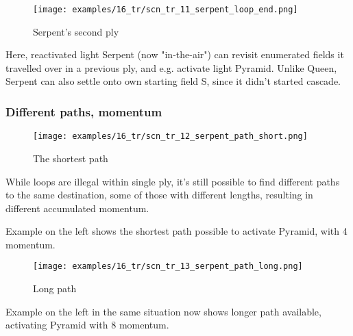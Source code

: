 \vspace*{-2.1\baselineskip}
\noindent
\begin{figure}[!h]
\texttt{[image: examples/16\_tr/scn\_tr\_11\_serpent\_loop\_end.png]}
\caption{Serpent's second ply}
\label{fig:scn_tr_11_serpent_loop_end}
\end{figure}

Here, reactivated light Serpent (now "in-the-air") can revisit enumerated fields
it travelled over in a previous ply, and e.g. activate light Pyramid. \newline
\indent
Unlike Queen, Serpent can also settle onto own starting field S, since it didn't
started cascade.

\clearpage %

\subsubsection*{Different paths, momentum}
\label{sec:Tamoanchan Revisited/Serpent/Movement/Different paths, momentum}

\vspace*{-1.2\baselineskip}
\noindent
\begin{wrapfigure}[9]{l}{0.4\textwidth}
\centering
\texttt{[image: examples/16\_tr/scn\_tr\_12\_serpent\_path\_short.png]}
\vspace*{-0.5\baselineskip}
\caption{The shortest path}
\label{fig:scn_tr_12_serpent_path_short}
\end{wrapfigure}
While loops are illegal within single ply, it's still possible to find
different paths to the same destination, some of those with different
lengths, resulting in different accumulated momentum.

Example on the left shows the shortest path possible to activate Pyramid,
with 4 momentum.


\vspace*{0.3\baselineskip}
\noindent
\begin{wrapfigure}[4]{l}{0.4\textwidth}
\centering
\texttt{[image: examples/16\_tr/scn\_tr\_13\_serpent\_path\_long.png]}
\vspace*{-0.5\baselineskip}
\caption{Long path}
\label{fig:scn_tr_13_serpent_path_long}
\end{wrapfigure}
Example on the left in the same situation now shows longer path available,
activating Pyramid with 8 momentum.

